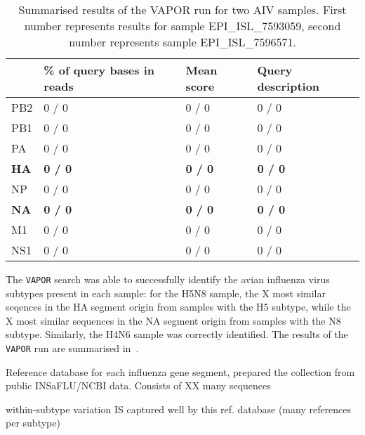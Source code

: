 \setlength{\tabcolsep}{10pt}
\begin{table}[]
    \begin{tabular}{@{}llll@{}}
    \toprule
                & \textbf{\% of query bases in reads} & \textbf{Mean score} & \textbf{Query description} \\ \midrule
    PB2         & 0 / 0                               & 0 / 0               & 0 / 0                      \\
    PB1         & 0 / 0                               & 0 / 0               & 0 / 0                      \\
    PA          & 0 / 0                               & 0 / 0               & 0 / 0                      \\
    \textbf{HA} & \textbf{0 / 0}                      & \textbf{0 / 0}      & \textbf{0 / 0}             \\
    NP          & 0 / 0                               & 0 / 0               & 0 / 0                      \\
    \textbf{NA} & \textbf{0 / 0}                      & \textbf{0 / 0}      & \textbf{0 / 0}             \\
    M1          & 0 / 0                               & 0 / 0               & 0 / 0                      \\
    NS1         & 0 / 0                               & 0 / 0               & 0 / 0                      \\ \bottomrule
    \end{tabular}
    \caption{Summarised results of the VAPOR run for two AIV samples. First number represents results for sample EPI\_ISL\_7593059, second number represents sample EPI\_ISL\_7596571.}
\label{tab:4-aiv-vapor}
\end{table}

The \texttt{VAPOR} search was able to successfully identify the avian influenza virus subtypes present in each sample: for the H5N8 sample, the X most similar seqences in the HA segment origin from samples with the H5 subtype, while the X most similar sequences in the NA segment origin from samples with the N8 subtype. Similarly, the H4N6 sample was correctly identified. The results of the \texttt{VAPOR} run are summarised in~.

\todoit
Reference database for each influenza gene segment, prepared the collection from public INSaFLU/NCBI data. Consists of XX many sequences

within-subtype variation IS captured well by this ref. database (many references per subtype)

